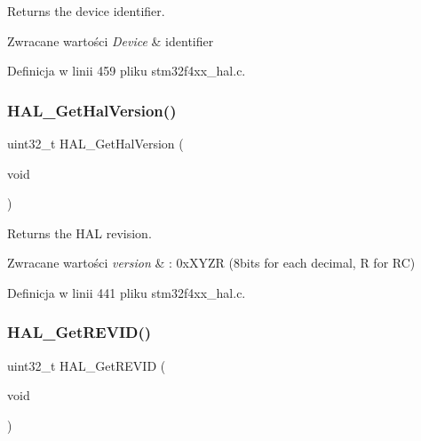 Returns the device identifier. 


\begin{DoxyRetVals}{Zwracane wartości}
{\em Device} & identifier \\
\hline
\end{DoxyRetVals}


Definicja w linii 459 pliku stm32f4xx\+\_\+hal.\+c.

\mbox{\label{group___h_a_l___exported___functions___group2_gafb139b375512ad2a234e4619b129b966}} 
\subsubsection{\texorpdfstring{H\+A\+L\+\_\+\+Get\+Hal\+Version()}{HAL\_GetHalVersion()}}
{\footnotesize\ttfamily uint32\+\_\+t H\+A\+L\+\_\+\+Get\+Hal\+Version (\begin{DoxyParamCaption}\item[{void}]{ }\end{DoxyParamCaption})}



Returns the H\+AL revision. 


\begin{DoxyRetVals}{Zwracane wartości}
{\em version} & \+: 0x\+X\+Y\+ZR (8bits for each decimal, R for RC) \\
\hline
\end{DoxyRetVals}


Definicja w linii 441 pliku stm32f4xx\+\_\+hal.\+c.

\mbox{\label{group___h_a_l___exported___functions___group2_gae051ef9e932404b21f5877c7186406b8}} 
\subsubsection{\texorpdfstring{H\+A\+L\+\_\+\+Get\+R\+E\+V\+I\+D()}{HAL\_GetREVID()}}
{\footnotesize\ttfamily uint32\+\_\+t H\+A\+L\+\_\+\+Get\+R\+E\+V\+ID (\begin{DoxyParamCaption}\item[{void}]{ }\end{DoxyParamCaption})}



